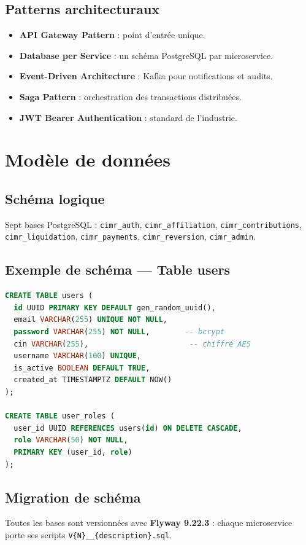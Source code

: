 \documentclass[12pt,a4paper,oneside]{report}
\begin{document}
\subsection{Patterns architecturaux}
\begin{itemize}
    \item \textbf{API Gateway Pattern} : point d'entrée unique.
    \item \textbf{Database per Service} : un schéma PostgreSQL par microservice.
    \item \textbf{Event-Driven Architecture} : Kafka pour notifications et audits.
    \item \textbf{Saga Pattern} : orchestration des transactions distribuées.
    \item \textbf{JWT Bearer Authentication} : standard de l'industrie.
\end{itemize}

\section{Modèle de données}

\subsection{Schéma logique}
Sept bases PostgreSQL : \texttt{cimr\_auth}, \texttt{cimr\_affiliation}, \texttt{cimr\_contributions}, \texttt{cimr\_liquidation}, \texttt{cimr\_payments}, \texttt{cimr\_reversion}, \texttt{cimr\_admin}.

\subsection{Exemple de schéma --- Table users}
\begin{lstlisting}[language=SQL,caption={Schéma de la table users}]
CREATE TABLE users (
  id UUID PRIMARY KEY DEFAULT gen_random_uuid(),
  email VARCHAR(255) UNIQUE NOT NULL,
  password VARCHAR(255) NOT NULL,        -- bcrypt
  cin VARCHAR(255),                       -- chiffré AES
  username VARCHAR(100) UNIQUE,
  is_active BOOLEAN DEFAULT TRUE,
  created_at TIMESTAMPTZ DEFAULT NOW()
);

CREATE TABLE user_roles (
  user_id UUID REFERENCES users(id) ON DELETE CASCADE,
  role VARCHAR(50) NOT NULL,
  PRIMARY KEY (user_id, role)
);
\end{lstlisting}

\subsection{Migration de schéma}
Toutes les bases sont versionnées avec \textbf{Flyway 9.22.3} : chaque microservice porte ses scripts \texttt{V\{N\}\_\_\{description\}.sql}.
\end{document}
